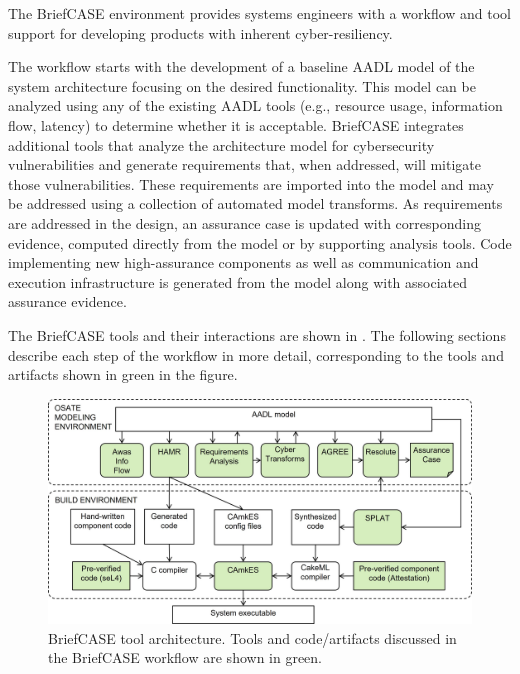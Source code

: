

The BriefCASE environment provides systems engineers with a workflow and tool support for developing
products with inherent cyber-resiliency. 

The  workflow starts with the development of a baseline AADL model of the system architecture
focusing on the desired functionality. This model can be analyzed using any of the existing AADL 
tools (e.g., resource usage, information flow, latency) to determine whether it is acceptable.
BriefCASE integrates additional tools that analyze the architecture model for cybersecurity vulnerabilities and
generate requirements that, when addressed, will mitigate those vulnerabilities.
These requirements are imported into the model and may be addressed using a 
collection of automated model transforms. As requirements are addressed in the design, an assurance case is updated with
corresponding evidence, computed directly from the model or by supporting analysis tools.  
Code implementing new high-assurance components as well as communication and execution infrastructure
is generated from the model along with associated assurance evidence.  

The BriefCASE tools and their interactions are shown in .   
The following sections describe each step of the workflow in more detail, corresponding
to the tools and artifacts shown in green in the figure.  

\begin{figure}
	\begin{center}
	  \includegraphics[width=\textwidth]{./figs/tool-arch.jpg}
  	\end{center}
	\caption{BriefCASE tool architecture.  Tools and code/artifacts discussed in the BriefCASE workflow are shown in green.} 
	\label{fig:tool-arch} 
\end{figure}

